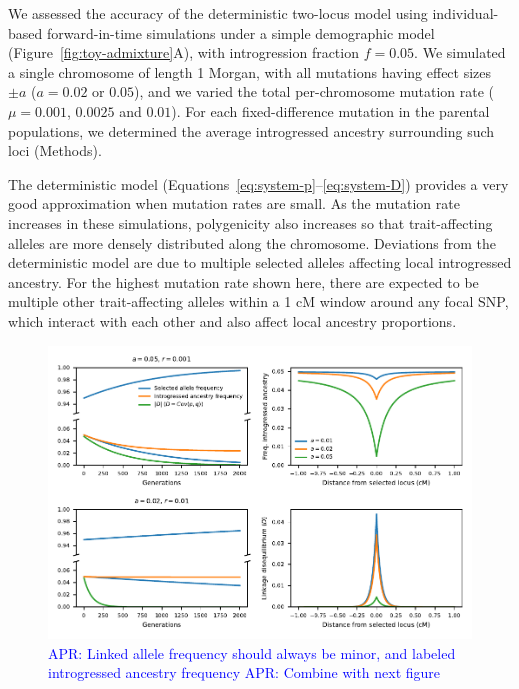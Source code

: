 \documentclass{article}
\newcommand{\aprcomment}[1]{{\textcolor{blue}{APR: #1}}}
\begin{document}
We assessed the accuracy of the deterministic two-locus model using
individual-based forward-in-time simulations \citep{thornton2019polygenic}
under a simple demographic model (Figure~\ref{fig:toy-admixture}A), with
introgression fraction \(f=0.05\). We simulated a single chromosome of length 1
Morgan, with all mutations having effect sizes \(\pm a\) (\(a=0.02\) or
\(0.05\)), and we varied the total per-chromosome mutation rate (\(\mu=0.001\),
\(0.0025\) and \(0.01\)). For each fixed-difference mutation in the parental
populations, we determined the average introgressed ancestry surrounding such
loci (Methods).

The deterministic model (Equations~\ref{eq:system-p}--\ref{eq:system-D})
provides a very good approximation when mutation rates are small. As the
mutation rate increases in these simulations, polygenicity also increases so
that trait-affecting alleles are more densely distributed along the chromosome.
Deviations from the deterministic model are due to multiple selected alleles
affecting local introgressed ancestry. For the highest mutation rate shown
here, there are expected to be multiple other trait-affecting alleles within a
1 cM window around any focal SNP, which interact with each other and also
affect local ancestry proportions.

\begin{figure}[t!]
    \centering
    \includegraphics{../figures/linkage_predictions.pdf}
    \caption{
        \textbf{}
        \aprcomment{Linked allele frequency should always be minor, and labeled
        introgressed ancestry frequency}
        \aprcomment{Combine with next figure}
    }
    \label{fig:linkage-pred}
\end{figure}
\end{document}
